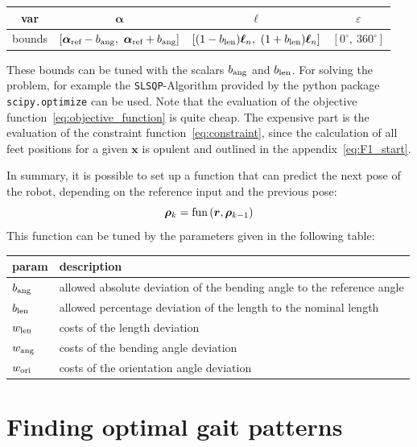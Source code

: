 \documentclass[10pt,a4paper]{article}
\begin{document}
\begin{center}
\begin{tabular}{c|c|c|c}
var & $\bm{\alpha}$ & $\bm{\ell}$ & $\varepsilon$ \\ 
\hline
bounds & $\left[ \bm{\alpha_{\textnormal{ref}}}-b_{\textnormal{ang}},~\bm{\alpha_{\textnormal{ref}}}+b_{\textnormal{ang}} \right]$ &
$\left[ (1-b_\textnormal{len})\bm{\ell}_n,~(1+b_\textnormal{len})\bm{\ell}_n \right]$ &
$\left[ 0^\circ,~ 360^\circ \right]$
\end{tabular}
\end{center}
These bounds can be tuned with the scalars $b_{\textnormal{ang}}$ and $b_{\textnormal{len}}$.
For solving the problem, for example the \texttt{SLSQP}-Algorithm provided by the python package \texttt{scipy.optimize} can be used.
Note that the evaluation of the objective function~\eqref{eq:objective_function} is quite cheap. 
The expensive part is the evaluation of the constraint function~\eqref{eq:constraint}, since the calculation of all feet positions for a given $\bm{x}$ is opulent and outlined in the appendix~\eqref{eq:F1_start}.

In summary, it is possible to set up a function that can predict the next pose of the robot, depending on the reference input and the previous pose:
\begin{equation}
\bm{\rho}_k = \textnormal{fun}\left( \bm{r}, \bm{\rho}_{k-1} \right)
\end{equation}
This function can be tuned by the parameters given in the following table:
\begin{center}
\begin{tabular}{l|l}
param & description \\
\hline
$b_{\textnormal{ang}}$ & allowed absolute deviation of the bending angle to the reference angle \\
$b_{\textnormal{len}}$ & allowed percentage deviation of the length to the nominal length \\
$w_{\textnormal{len}}$ & costs of the length deviation \\
$w_{\textnormal{ang}}$ & costs of the bending angle deviation\\
$w_{\textnormal{ori}}$ & costs of the orientation angle deviation\\
\end{tabular}
\end{center}



\section{Finding optimal gait patterns}
\end{document}
